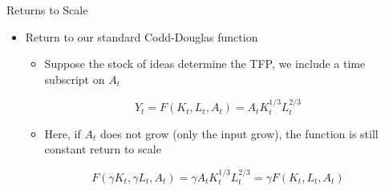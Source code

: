 \documentclass[aspectratio=1610]{beamer}
\begin{document}

%	

\begin{frame}[wide]{Returns to Scale}
	\begin{itemize}
		\item Return to our standard Codd-Douglas function
		\vspace{2mm}
		\begin{itemize}
			\item Suppose the stock of ideas determine the TFP, we include a time subscript on $A_t$
		\end{itemize}
		\[Y_t = F(K_t,L_t,A_t) = A_tK_t^{1/3}L_t^{2/3}\]
		\begin{itemize}
			\item Here, if $A_t$ does not grow (only the input grow), the function is still constant return to scale
		\end{itemize}
		\[F(\gamma K_t, \gamma L_t,A_t) = \gamma A_tK_t^{1/3}L_t^{2/3} = \gamma F(K_t, L_t,A_t)\]
	\end{itemize}
\end{frame}
\end{document}
